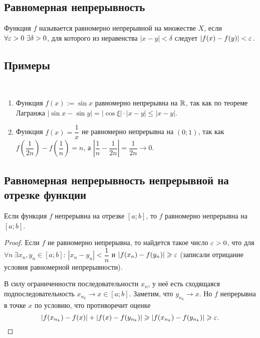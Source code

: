 \documentclass[a4paper]{article}
\theoremstyle{named}
\begin{document}
        \subsection{Равномерная непрерывность}

        \begin{definition*}
            Функция $f$ называется равномерно непрерывной на множестве $X$, если $\forall \varepsilon > 0 \ \exists \delta  > 0$, для которого из неравенства $|x - y| < \delta$ следует $|f(x) - f(y)| < \varepsilon$.
        \end{definition*}

        \subsection{Примеры}

        \begin{example*}~
            
            \begin{enumerate}
            \item
                Функция $f(x) := \sin x$ равномерно непрерывна на $\mathbb{R}$, так как по теореме Лагранжа $|\sin x - \sin y| = |\cos \xi| \cdot |x - y| \leq |x - y|$.

            \item
                Функция $f(x) = \dfrac{1}{x}$ не равномерно непрерывна на $(0; 1)$, так как $f \left(\dfrac{1}{2n}\right) - f \left(\dfrac{1}{n}\right) = n$, а $\left|\dfrac{1}{n} - \dfrac{1}{2n}\right| = \dfrac{1}{2n} \to 0$.
            \end{enumerate}
        \end{example*}

        \subsection{Равномерная непрерывность непрерывной на отрезке функции}

        \begin{theorem*}
            Если функция $f$ непрерывна на отрезке $[a; b]$, то $f$ равномерно непрерывна на $[a; b]$.
        \end{theorem*}

        \begin{proof}
            Если $f$ не равномерно непрерывна, то найдется такое число $\varepsilon > 0$, что для $\forall n \ \exists x_n, y_n \in [a; b]: \ |x_n - y_n| < \dfrac{1}{n}$ и $|f(x_n) - f(y_n)| \geqslant \varepsilon$ (записали отрицание условия равномерной непрерывности). 

            В силу ограниченности последовательности $x_n$, у неё есть сходящаяся подпоследовательность $x_{n_k} \to x \in [a; b]$. Заметим, что $y_{n_k} \to x$. Но $f$ непрерывна в точке $x$ по условию, что противоречит оценке
            \begin{equation*}
                |f(x_{n_k}) - f(x)| + |f(x) - f(y_{n_k})| \geqslant |f(x_{n_k}) - f(y_{n_k})| \geqslant \varepsilon.
            \end{equation*}
        \end{proof}
\end{document}
